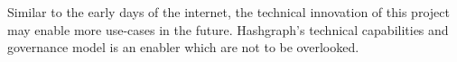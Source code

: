 Similar to the early days of the internet, the technical innovation of this project may enable more use-cases in the future. Hashgraph's technical capabilities and governance model is an enabler which are not to be overlooked.




